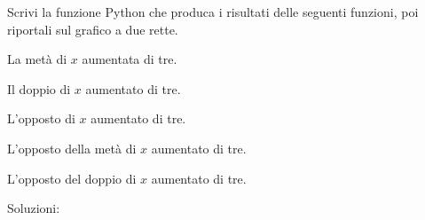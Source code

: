 \begin{esercizio}\label{ese:03.1}
Scrivi la funzione Python che produca i risultati delle seguenti funzioni, 
poi riportali sul grafico a due rette.
 \begin{enumeratea}
  \item La metà di $x$ aumentata di tre.
  \item Il doppio di $x$ aumentato di tre.
  \item L'opposto di $x$ aumentato di tre.
  \item L'opposto della metà di $x$ aumentato di tre.
  \item L'opposto del doppio di $x$ aumentato di tre.
 \end{enumeratea}

Soluzioni:

\begin{minipage}{.39\textwidth}

\end{minipage}
\begin{minipage}{.59\textwidth}
\end{minipage}

\begin{minipage}{.39\textwidth}

\end{minipage}
\begin{minipage}{.59\textwidth}
\end{minipage}

\begin{minipage}{.39\textwidth}

\end{minipage}
\begin{minipage}{.59\textwidth}
\end{minipage}

\begin{minipage}{.39\textwidth}

\end{minipage}
\begin{minipage}{.59\textwidth}
\end{minipage}

\begin{minipage}{.39\textwidth}

\end{minipage}
\begin{minipage}{.59\textwidth}
\end{minipage}

\end{esercizio}


